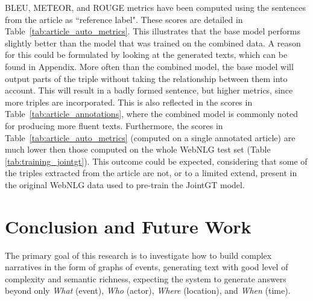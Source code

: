 \documentclass[
hf, %
]{ceurart}
\begin{document}
BLEU, METEOR, and ROUGE metrics have been computed using the sentences from the article as ``reference label". These scores are detailed in Table~\ref{tab:article_auto_metrics}. This illustrates that the base model performs slightly better than the model that was trained on the combined data. A reason for this could be formulated by looking at the generated texts, which can be found in Appendix. More often than the combined model, the base model will output parts of the triple without taking the relationship between them into account. This will result in a badly formed sentence, but higher metrics, since more triples are incorporated. This is also reflected in the scores in Table~\ref{tab:article_annotations}, where the combined model is commonly noted for producing more fluent texts.
Furthermore, the scores in Table~\ref{tab:article_auto_metrics} (computed on a single annotated article) are much lower then those computed on the whole WebNLG test set (Table \ref{tab:training_jointgt}). This outcome could be expected, considering that some of the triples extracted from the article are not, or to a limited extend, present in the original WebNLG data used to pre-train the JointGT model.


\section{Conclusion and Future Work}
\label{sec:conclusion}
The primary goal of this research is to investigate how to build complex narratives in the form of graphs of events, generating text with good level of complexity and semantic richness, expecting the system to generate answers beyond only
\textit{What} (event), \textit{Who} (actor), \textit{Where} (location), and \textit{When} (time).
\end{document}
